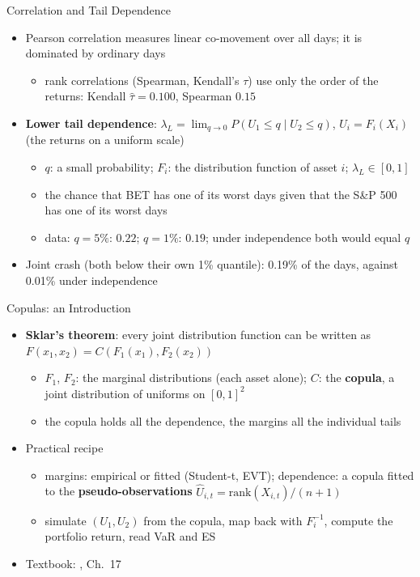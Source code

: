 \begin{frame}{Correlation and Tail Dependence}
\itemsize{\small}
\begin{itemize}
    \item Pearson correlation measures linear co-movement over all days; it is dominated by ordinary days 
    \begin{itemize}
        \item rank correlations (Spearman, Kendall's $\tau$) use only the order of the returns: Kendall $\hat\tau = 0.100$, Spearman $0.15$
    \end{itemize}
    \item \textbf{Lower tail dependence}: $\lambda_L = \lim_{q \to 0} P(U_1 \le q \mid U_2 \le q)$, $U_i = F_i(X_i)$ (the returns on a uniform scale)
    \begin{itemize}
        \item $q$: a small probability; $F_i$: the distribution function of asset $i$; $\lambda_L \in [0, 1]$
        \item the chance that BET has one of its worst days given that the S\&P 500 has one of its worst days
        \item data: $q = 5\%$: $0.22$; $q = 1\%$: $0.19$; under independence both would equal $q$
    \end{itemize}
    \item Joint crash (both below their own 1\% quantile): 0.19\% of the days, against 0.01\% under independence
\end{itemize}
\end{frame}

\begin{frame}{Copulas: an Introduction}
\itemsize{\small}
\begin{itemize}
    \item \textbf{Sklar's theorem}: every joint distribution function can be written as $F(x_1, x_2) = C(F_1(x_1), F_2(x_2))$ 
    \begin{itemize}
        \item $F_1$, $F_2$: the marginal distributions (each asset alone); $C$: the \textbf{copula}, a joint distribution of uniforms on $[0,1]^2$
        \item the copula holds all the dependence, the margins all the individual tails
    \end{itemize}
    \item Practical recipe
    \begin{itemize}
        \item margins: empirical or fitted (Student-t, EVT); dependence: a copula fitted to the \textbf{pseudo-observations} $\hat U_{i,t} = \mathrm{rank}(X_{i,t})/(n + 1)$
        \item simulate $(U_1, U_2)$ from the copula, map back with $F_i^{-1}$, compute the portfolio return, read VaR and ES
    \end{itemize}
    \item Textbook: , Ch.~17
\end{itemize}
\end{frame}

